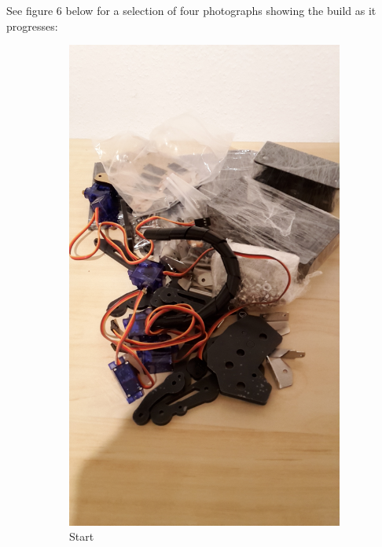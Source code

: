 \documentclass[progress]{cmpreport}
\begin{document}
See figure 6 below for a selection of four photographs showing the build as it progresses: 
\begin{figure} [H] 
	\caption{Build Progress from start to complete}
	\begin{subfigure}[h]{0.4\linewidth}
		\caption{Start}
		\includegraphics[trim=20cm 0cm 22cm 0cm, clip=true, totalheight=0.29\textheight, angle=-90]{photos/start.jpg}
	\end{subfigure}
	\hfill
	\begin{subfigure}[h]{0.4\linewidth}

\end{subfigure}
\end{figure}
\end{document}
